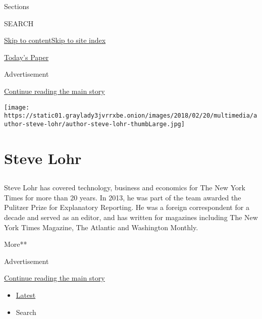 Sections

SEARCH

\protect\hyperlink{site-content}{Skip to
content}\protect\hyperlink{site-index}{Skip to site index}

\href{https://myaccount.nytimes3xbfgragh.onion/auth/login?response_type=cookie\&client_id=vi}{}

\href{https://www.nytimes3xbfgragh.onion/section/todayspaper}{Today's
Paper}

Advertisement

\protect\hyperlink{after-top}{Continue reading the main story}

\texttt{[image: https://static01.graylady3jvrrxbe.onion/images/2018/02/20/multimedia/author-steve-lohr/author-steve-lohr-thumbLarge.jpg]}

\hypertarget{steve-lohr}{%
\section{Steve Lohr}\label{steve-lohr}}

\hypertarget{section}{%
\subsection{}\label{section}}

Steve Lohr has covered technology, business and economics for The New
York Times for more than 20 years. In 2013, he was part of the team
awarded the Pulitzer Prize for Explanatory Reporting. He was a foreign
correspondent for a decade and served as an editor, and has written for
magazines including The New York Times Magazine, The Atlantic and
Washington Monthly.

More**

Advertisement

\protect\hyperlink{after-mid1}{Continue reading the main story}

\begin{itemize}
\tightlist
\item
  \protect\hyperlink{stream-panel}{Latest}
\item
  Search
\end{itemize}

